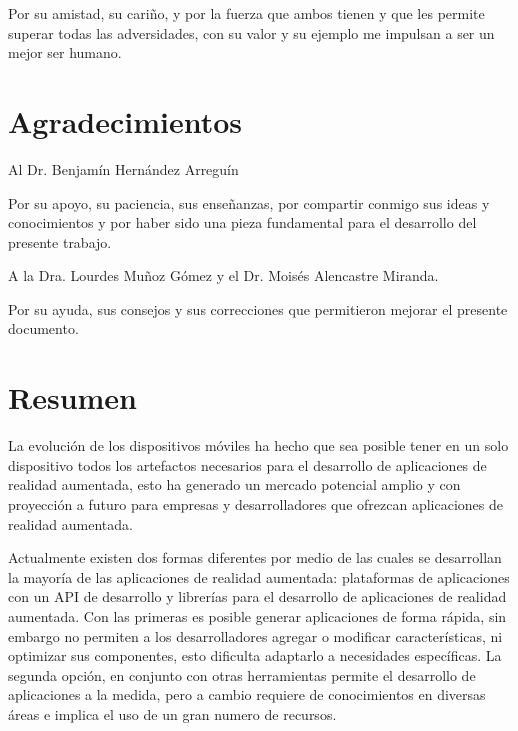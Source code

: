 \documentclass[12pt,a4paper,spanish,openany]{book}
\begin{document}
\noindent 
Por su amistad, su cariño, y por la fuerza que ambos tienen y que les permite
superar todas las adversidades, con su valor y su ejemplo me impulsan a ser un
mejor ser humano.





\newpage
\thispagestyle{empty}
\section*{Agradecimientos}

\vspace{35 mm}

\begin{large}
\noindent 
Al Dr. Benjamín Hernández Arreguín
\end{large}

\vspace{5 mm}
\noindent 
Por su apoyo, su paciencia, sus enseñanzas, por compartir
conmigo sus ideas y conocimientos y por haber sido una pieza fundamental para el desarrollo del
presente trabajo.

\vspace{25 mm}

\begin{large}
\noindent 
A la Dra. Lourdes Muñoz Gómez y el  Dr. Moisés Alencastre Miranda.
\end{large}

\vspace{5 mm}
\noindent 
Por su ayuda, sus consejos y sus correcciones que permitieron mejorar el
presente documento.



\newpage
\setlength{\parskip}{\baselineskip} 
\thispagestyle{empty}
\section*{Resumen}

La evolución de los dispositivos móviles ha hecho que sea posible tener en un
solo dispositivo todos los artefactos necesarios para el desarrollo de
aplicaciones de realidad aumentada, esto ha generado un mercado potencial amplio
y con proyección a futuro para empresas y desarrolladores que ofrezcan
aplicaciones de realidad aumentada.

Actualmente existen dos formas diferentes por medio de las cuales se desarrollan la mayoría de las
aplicaciones de realidad aumentada: plataformas de aplicaciones con un API de
desarrollo y librerías para el desarrollo de aplicaciones de realidad aumentada.
Con las primeras es posible generar aplicaciones de forma rápida, sin embargo no
permiten a los desarrolladores agregar o modificar características, ni optimizar
sus componentes, esto dificulta adaptarlo a necesidades específicas. La
segunda opción, en conjunto con otras herramientas permite el desarrollo de
aplicaciones a la medida, pero a cambio requiere de conocimientos en diversas áreas e implica el uso de un
gran numero de recursos.
\end{document}
